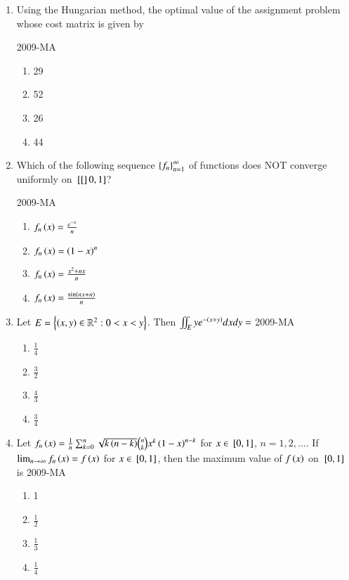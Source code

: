 \documentclass[journal,12pt,onecolumn]{IEEEtran}
\theoremstyle{remark}
\begin{document}
\begin{enumerate}
	\item Using the Hungarian method, the optimal value of the assignment problem whose cost matrix is given by 
		\begin{table}[ht]
		\centering
		
		\end{table}
\hfill{2009-MA}
	\begin{multicols}{4}
	\begin{enumerate}
		\item 29
		\item 52
		\item 26
		\item 44
	\end{enumerate}
	\end{multicols}

	\item Which of the following sequence $\left\{f_{n}\right\}_{n=1}^{\infty}$ of functions does NOT converge uniformly on ${}\left[[\right]0,1]$?

		\hfill{2009-MA}
	\begin{multicols}{2}
	\begin{enumerate}
		\item $f_{n}\left(x\right)=\frac{e^{-x}}{n}$
		\item $f_{n}\left(x\right)=\left(1-x\right)^{n}$
		\item $f_{n}\left(x\right)=\frac{x^{2}+nx}{n}$
		\item $f_{n}\left(x\right)=\frac{\sin\left(nx+n\right)}{n}$
	\end{enumerate}
	\end{multicols}

	\item Let $E=\left\{\left(x,y\right)\in \mathbb{R}^{2} : 0<x<y\right\}$. Then $\iint_{E} ye^{-\left(x+y\right)}dxdy=$
\hfill{2009-MA}
	\begin{multicols}{2}
	\begin{enumerate}
		\item $\frac{1}{4}$
		\item $\frac{3}{2}$
		\item $\frac{4}{3}$
		\item $\frac{3}{4}$
	\end{enumerate}
	\end{multicols}

	\item Let $f_{n}\left(x\right)=\frac{1}{n} \sum _{k=0}^{n} \sqrt{k\left(n-k\right)} \binom{n}{k} x^{k} \left(1-x\right)^{n-k}$ for $x\in {}\left[0,1\right]$, $n=1, 2, \dots$. If $\lim _{n\to \infty} f_{n}\left(x\right)=f\left(x\right)$ for $x\in {}\left[0,1\right]$, then the maximum value of $f\left(x\right)$ on ${}\left[0,1\right]$ is
\hfill{2009-MA}
	\begin{multicols}{4}
	\begin{enumerate}
		\item 1
		\item $\frac{1}{2}$
		\item $\frac{1}{3}$
		\item $\frac{1}{4}$
	\end{enumerate}
	\end{multicols}


\end{enumerate}
\end{document}
